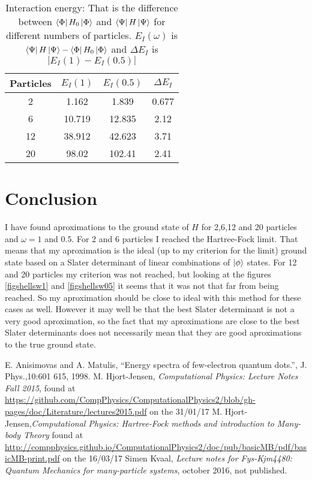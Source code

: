 \documentclass[a4paper,english,12pt]{article}
\begin{document}
\begin{table}
  \caption{Interaction energy: That is the difference between $\Bra{\Phi}H_0\Ket{\Phi}$ and $\Bra{\Psi}H\Ket{\Psi}$ for
    different numbers of particles. $E_I(\omega)$ is $\Bra{\Psi}H\Ket{\Psi}-\Bra{\Phi}H_0\Ket{\Phi}$ and
    \(\Delta E_I\) is \(|E_I(1)-E_I(0.5)|\)}\label{tabI}
  \begin{center}
    \begin{tabular}{*{4}{c}}
      Particles &  $E_I(1)$ & $E_I(0.5)$ & $\Delta E_I$ \\
      \hline
      2&1.162 & 1.839 & 0.677\\
      6&10.719&12.835 &2.12\\
      12&38.912 & 42.623 & 3.71\\
      20&98.02 & 102.41 & 2.41\\
    \end{tabular}
  \end{center}
\end{table}




\section{Conclusion}
I have found aproximations to the ground state of $H$ for 2,6,12 and 20 particles and $\omega = 1$ and $0.5$. For 2 and 6 particles I reached the
Hartree-Fock limit. That means that my aproximation is the ideal (up to my criterion for the limit) ground state based on a Slater determinant
of linear combinations of $\ket{\phi}$ states. For 12 and 20 particles my criterion was not reached, but looking at the figures \ref{figshellsw1}
and \ref{figshellsw05} it seems that it was not that far from being reached. So my aproximation should be close to ideal with this method for these
cases as well. However it may well be that the best Slater determinant is not a very good aproximation, so the fact that my aproximations are close
to the best Slater determinants does not necessarily mean that they are good aproximations to the true ground state.

\begin{thebibliography}{1}


  E. Anisimovas and A. Matulis, ``Energy spectra of few-electron quantum dots.'', J. Phys.,10:601 615, 1998.
  M. Hjort-Jensen, \emph{Computational Physics: Lecture Notes Fall 2015}, found at
  \url{https://github.com/CompPhysics/ComputationalPhysics2/blob/gh-pages/doc/Literature/lectures2015.pdf}
  on the 31/01/17
  M. Hjort-Jensen,\emph{Computational Physics: Hartree-Fock methods and introduction to Many-body Theory}
  found at \url{http://compphysics.github.io/ComputationalPhysics2/doc/pub/basicMB/pdf/basicMB-print.pdf}
  on the 16/03/17
  Simen Kvaal, \emph{Lecture notes for Fys-Kjm4480: Quantum Mechanics for many-particle systems},
  october 2016, not published.
\end{thebibliography}
\end{document}
